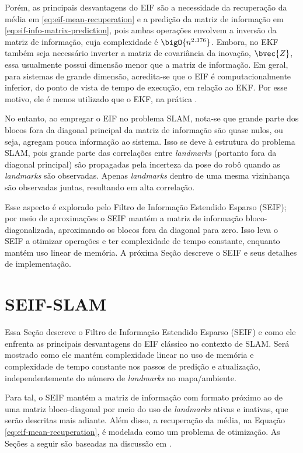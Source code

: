 Porém, as principais desvantagens do EIF são a necessidade da recuperação da média em \ref{eq:eif-mean-recuperation} e a predição da matriz de informação em 
\ref{eq:eif-info-matrix-prediction}, pois ambas operações envolvem a inversão 
da matriz de informação, cuja complexidade é $\bigO{n^{2.376}}$. Embora, no EKF 
também seja 
necessário inverter a matriz de covariância da inovação, $\bvec{Z}$, 
essa usualmente possui dimensão menor que a matriz de informação. 
Em geral, para sistemas de grande dimensão, acredita-se que o EIF é 
computacionalmente inferior, do ponto de vista de tempo de execução, em relação 
ao EKF. Por esse motivo, ele é menos utilizado que o EKF, na prática 
\cite[p.~78]{bongard2006probabilistic}.

No entanto, ao empregar o EIF no problema SLAM, nota-se que grande parte dos 
blocos fora da diagonal principal da matriz de informação são quase nulos, ou 
seja, agregam pouca informação ao sistema. Isso se deve à estrutura do problema 
SLAM, pois grande parte das correlações entre \textit{landmarks} (portanto 
fora da diagonal principal) são propagadas pela incerteza da pose do robô 
quando as \textit{landmarks} são observadas. Apenas 
\textit{landmarks} dentro de uma mesma vizinhança são observadas juntas, 
resultando em alta correlação.

Esse aspecto é explorado pelo Filtro de Informação Estendido Esparso (SEIF); 
por meio de aproximações o SEIF mantém a matriz de informação bloco-diagonalizada, 
aproximando os blocos fora da diagonal para zero. Isso leva o SEIF a otimizar 
operações e ter complexidade de tempo constante, enquanto mantém uso linear de 
memória. A próxima Seção descreve o SEIF e seus detalhes de implementação.

\section{SEIF-SLAM}
Essa Seção descreve o Filtro de Informação Estendido Esparso (SEIF) e 
como ele enfrenta as principais desvantagens do EIF clássico no 
contexto de SLAM. Será mostrado como ele mantém complexidade 
linear no uso de memória e complexidade de tempo constante nos passos de predição e atualização, independentemente do número de 
\textit{landmarks} no mapa/ambiente.

Para tal, o SEIF mantém a matriz de informação 
com formato próximo ao de uma matriz bloco-diagonal por meio do uso de 
\textit{landmarks} ativas e inativas, que serão descritas mais adiante. 
Além disso, a recuperação da média, na Equação 
\ref{eq:eif-mean-recuperation}, é modelada como um problema de 
otimização. As Seções a seguir são baseadas na discussão em \cite[Capítulo~12.4]{bongard2006probabilistic}.

